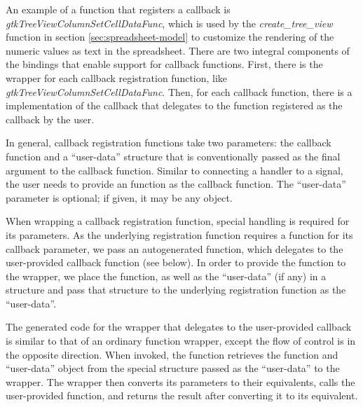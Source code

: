 \documentclass[article]{jss}
\begin{document}
An example of a function that registers a callback is \emph{gtkTreeViewColumnSetCellDataFunc}, which is used by the \emph{create\_tree\_view} function in section \ref{sec:spreadsheet-model} to customize the rendering of the numeric values as text in the spreadsheet. There are two integral components of the bindings that enable support for callback functions. First, there is the wrapper for each callback registration function, like \emph{gtkTreeViewColumnSetCellDataFunc}. Then, for each callback function, there is a  implementation of the callback that delegates to the  function registered as the callback by the user.

In general, callback registration functions take two parameters: the callback function and a ``user-data'' structure that is conventionally passed as the final argument to the callback function. Similar to connecting a handler to a signal, the user needs to provide an  function as the callback function. The ``user-data'' parameter is optional; if given, it may be any  object.

When wrapping a callback registration function, special handling is required for its parameters. As the underlying  registration function requires a  function for its callback parameter, we pass an autogenerated  function, which delegates to the user-provided  callback function (see below). In order to provide the   function to the  wrapper, we place the  function, as well as the  ``user-data'' (if any) in a structure and pass that structure to the underlying  registration function as the ``user-data''.

The generated code for the  wrapper that delegates to the user-provided  callback is similar to that of an ordinary function wrapper, except the flow of control is in the opposite direction. When invoked, the function retrieves the  function and ``user-data'' object from the special structure passed as the ``user-data'' to the wrapper. The wrapper then converts its parameters to their  equivalents, calls the user-provided  function, and returns the result after converting it to its  equivalent.


\end{document}
